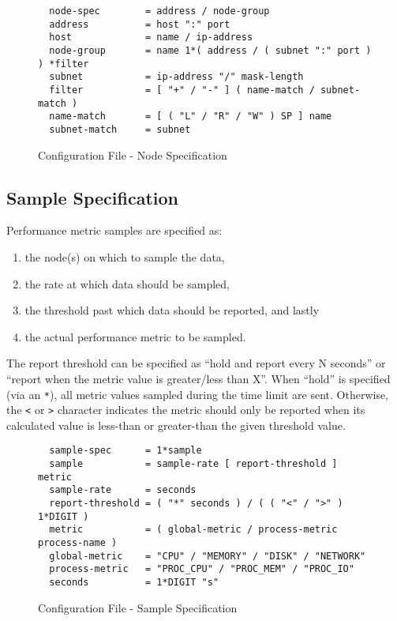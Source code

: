 \begin{figure}[H]
\vspace{+10pt}
\begin{verbatim}
  node-spec        = address / node-group
  address          = host ":" port
  host             = name / ip-address
  node-group       = name 1*( address / ( subnet ":" port ) ) *filter
  subnet           = ip-address "/" mask-length
  filter           = [ "+" / "-" ] ( name-match / subnet-match )
  name-match       = [ ( "L" / "R" / "W" ) SP ] name
  subnet-match     = subnet
\end{verbatim}
\vspace{-20pt}
\caption{Configuration File - Node Specification}
\label{fig:config_file_node}
\end{figure}

\subsection{Sample Specification}

Performance metric samples are specified as:

\begin{enumerate}
\item the node(s) on which to sample the data,
\item the rate at which data should be sampled,
\item the threshold past which data should be reported, and lastly
\item the actual performance metric to be sampled.
\end{enumerate}

The report threshold can be specified as ``hold and report every N seconds'' or ``report when the metric value is
greater/less than X''. When ``hold'' is specified (via an \texttt{*}), all metric values sampled during the time limit
are sent. Otherwise, the \texttt{<} or \texttt{>} character indicates the metric should only be reported when its
calculated value is less-than or greater-than the given threshold value.

\begin{figure}[ht]
\vspace{+10pt}
\begin{verbatim}
  sample-spec      = 1*sample
  sample           = sample-rate [ report-threshold ] metric
  sample-rate      = seconds
  report-threshold = ( "*" seconds ) / ( ( "<" / ">" ) 1*DIGIT )
  metric           = ( global-metric / process-metric process-name )
  global-metric    = "CPU" / "MEMORY" / "DISK" / "NETWORK"
  process-metric   = "PROC_CPU" / "PROC_MEM" / "PROC_IO"
  seconds          = 1*DIGIT "s"
\end{verbatim}
\vspace{-20pt}
\caption{Configuration File - Sample Specification}
\label{fig:config_file_sample}
\end{figure}


